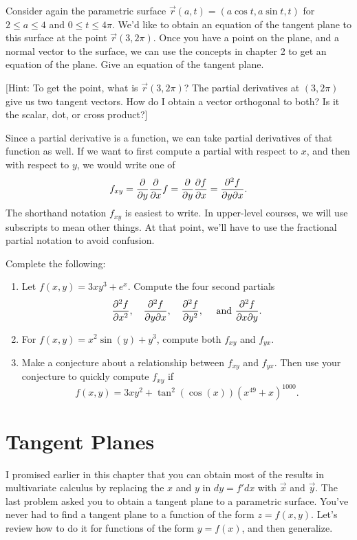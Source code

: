 \begin{problem}
 Consider again the parametric surface $\vec r(a,t) = (a\cos t, a\sin t, t)$ for $2\leq a\leq 4$ and $0\leq t\leq 4\pi$. 
 We'd like to obtain an equation of the tangent plane to this surface at the point $\vec r(3,2\pi)$. Once you have a point on the plane, and a normal vector to the surface, we can use the concepts in chapter 2 to get an equation of the plane. Give an equation of the tangent plane.

 [Hint: To get the point, what is $\vec r(3,2\pi)$? The partial derivatives at $(3,2\pi)$ give us two tangent vectors.  How do I obtain a vector orthogonal to both? Is it the scalar, dot, or cross product?]
\end{problem}


Since a partial derivative is a function, we can take partial derivatives of that function as well.  
If we want to first compute a partial with respect to $x$, and then with respect to $y$, we would write one of $$f_{xy}=\displaystyle\frac{\partial}{\partial y}\frac{\partial}{\partial x}f = \frac{\partial}{\partial y}\frac{\partial f}{\partial x} = \frac{\partial^2 f}{\partial y \partial x}.$$
The shorthand notation $f_{xy}$ is easiest to write. In upper-level courses, we will use subscripts to mean other things. At that point, we'll have to use the fractional partial notation to avoid confusion.

\begin{problem}\label{second partials agree}%
Complete the following:
\begin{enumerate}
 \item Let $f(x,y)=3xy^3+e^{x}.$
Compute the four second partials $$\displaystyle \frac{\partial^2 f}{ \partial x^2},\quad \displaystyle\frac{\partial^2 f}{\partial y \partial x},\quad \displaystyle\frac{\partial^2 f}{\partial y^2}, \quad \text{ and }\displaystyle\frac{\partial^2 f}{\partial x \partial y}.$$
 \item For $f(x,y)=x^2\sin(y)+y^3$, compute both $f_{xy}$ and $f_{yx}$.  
 \item Make a conjecture about a relationship between $f_{xy}$ and $f_{yx}$. Then use your conjecture to quickly compute $f_{xy}$ if $$f(x,y)=3xy^2+\tan^{2}(\cos(x)) (x^{49}+x)^{1000}.$$ 
\end{enumerate}
\end{problem}



\section{Tangent Planes}
I promised earlier in this chapter that you can obtain most of the results in multivariate calculus by replacing the $x$ and $y$ in $dy=f'dx$ with $\vec x$ and $\vec y$. The last problem asked you to obtain a tangent plane to a parametric surface. You've never had to find a tangent plane to a function of the form $z=f(x,y)$.  Let's review how to do it for functions of the form $y=f(x)$, and then generalize. 

